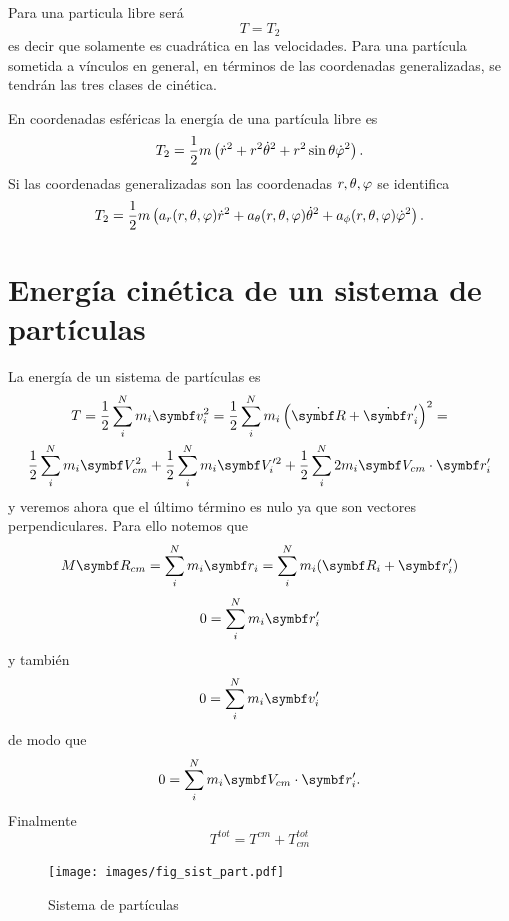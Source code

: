 \documentclass[10pt,oneside]{CBFT_book}
\begin{document}
Para una particula libre será
\[
	T = T_2
\]
es decir que solamente es cuadrática en las velocidades. Para una partícula sometida a vínculos en general, en términos
de las coordenadas generalizadas, se tendrán las tres clases de cinética.

En coordenadas esféricas la energía de una partícula libre es 
\[
	T_2 =  \frac{1}{2} m \left( \dot{r}^2 + r^2 \dot{\theta}^2 + r^2 \sin \theta \dot{\varphi}^2 \right).
\]
Si las coordenadas generalizadas son las coordenadas $ r, \theta, \varphi $ se identifica 
\[
	T_2 =  \frac{1}{2} m \left( a_r(r, \theta, \varphi ) \dot{r}^2 + a_\theta(r, \theta, \varphi ) \dot{\theta}^2 + 
	a_\phi(r, \theta, \varphi ) \dot{\varphi}^2 \right).
\]

\section{Energía cinética de un sistema de partículas}

La energía de un sistema de partículas es 
\begin{multline*}
	T = \frac{1}{2} \sum_i^N m_i \vb{v}_i^2 = 
	\frac{1}{2} \sum_i^N m_i \left( \dot{\vb{R}} + \dot{\vb{r}}_i' \right)^2 = \\
	\frac{1}{2} \sum_i^N m_i \vb{V}_{cm}^2  +
	\frac{1}{2} \sum_i^N m_i \vb{V}_i'^2 +
	\frac{1}{2} \sum_i^N 2 m_i \vb{V}_{cm} \cdot  \vb{r}_{i}' 
\end{multline*}
y veremos ahora que el último término es nulo ya que son vectores perpendiculares.
Para ello notemos que 
\[
	M \vb{R}_{cm} = \sum_i^N m_i \vb{r}_i = \sum_i^N m_i ( \vb{R}_i + \vb{r}_i' )
\]
\[
	0 = \sum_i^N m_i \vb{r}_i'
\]
y también 
\[
	0 = \sum_i^N m_i \vb{v}_i'
\]
de modo que 
\[
	0 = \sum_i^N m_i \vb{V}_{cm} \cdot \vb{r}_i'.
\]
Finalmente 
\[
	T^{tot} = T^{cm} + T_{cm}^{tot}
\]

\begin{figure}
	\begin{center}
	\texttt{[image: images/fig\_sist\_part.pdf]}	 
	\end{center}
	\caption{Sistema de partículas}
\end{figure} 

\end{document}
